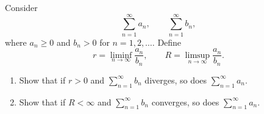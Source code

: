 \begingroup
\renewcommand{\labelenumi}{(\roman{enumi})}
\begin{exercise}
  \label{ex:hw04:lower-upper-comparison}
  Consider
  \[
    \sum_{n=1}^{\infty}a_n,\qquad\sum_{n=1}^{\infty}b_n,
  \]
  where $a_n\ge0$ and $b_n>0$ for $n=1,2,\ldots$. Define
  \[
    r=\liminf_{n\to\infty}\frac{a_n}{b_n},\qquad
    R=\limsup_{n\to\infty}\frac{a_n}{b_n}.
  \]
  \begin{enumerate}
    \item Show that if $r>0$ and $\sum_{n=1}^{\infty}b_n$ diverges,
      so does $\sum_{n=1}^{\infty}a_n$.
    \item Show that if $R<\infty$ and $\sum_{n=1}^{\infty}b_n$ converges,
      so does $\sum_{n=1}^{\infty}a_n$.
  \end{enumerate}
\end{exercise}
\endgroup
